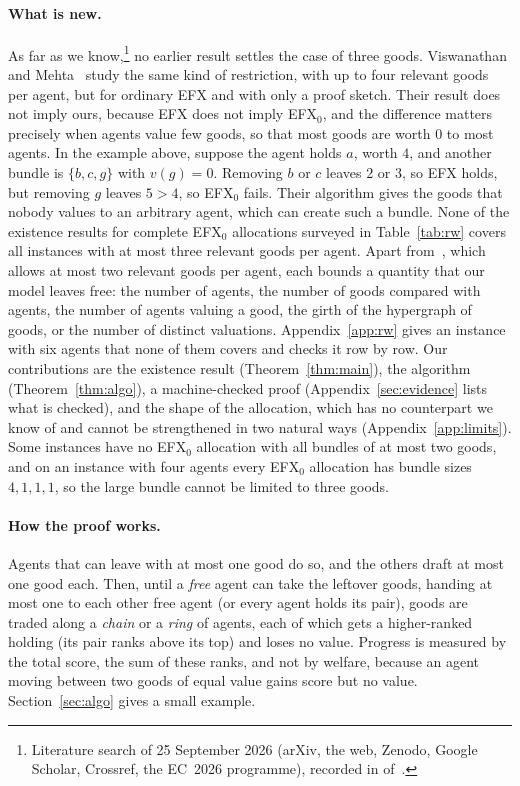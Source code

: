 \documentclass[runningheads,11pt]{llncs}
\newcommand{\efxz}{\texorpdfstring{\mbox{EFX$_0$}}{EFX0}}
\begin{document}
\paragraph{What is new.} As far as we know,\footnote{Literature search of 25 September 2026 (arXiv, the web, Zenodo, Google Scholar, Crossref, the EC~2026 programme), recorded in  of~\cite{Repo}.} no earlier result settles the case of three goods. Viswanathan and Mehta~\cite{ViswanathanM24} study the same kind of restriction, with up to four relevant goods per agent, but for ordinary EFX and with only a proof sketch. Their result does not imply ours, because EFX does not imply \efxz{}, and the difference matters precisely when agents value few goods, so that most goods are worth $0$ to most agents. In the example above, suppose the agent holds $a$, worth $4$, and another bundle is $\{b,c,g\}$ with $v(g)=0$. Removing $b$ or $c$ leaves $2$ or $3$, so EFX holds, but removing $g$ leaves $5>4$, so \efxz{} fails. Their algorithm gives the goods that nobody values to an arbitrary agent, which can create such a bundle. None of the existence results for complete \efxz{} allocations surveyed in Table~\ref{tab:rw} covers all instances with at most three relevant goods per agent. Apart from~\cite{MrdEfx}, which allows at most two relevant goods per agent, each bounds a quantity that our model leaves free: the number of agents, the number of goods compared with agents, the number of agents valuing a good, the girth of the hypergraph of goods, or the number of distinct valuations. Appendix~\ref{app:rw} gives an instance with six agents that none of them covers and checks it row by row. Our contributions are the existence result (Theorem~\ref{thm:main}), the algorithm (Theorem~\ref{thm:algo}), a machine-checked proof (Appendix~\ref{sec:evidence} lists what is checked), and the shape of the allocation, which has no counterpart we know of and cannot be strengthened in two natural ways (Appendix~\ref{app:limits}). Some instances have no \efxz{} allocation with all bundles of at most two goods, and on an instance with four agents every \efxz{} allocation has bundle sizes $4,1,1,1$, so the large bundle cannot be limited to three goods.

\paragraph{How the proof works.} Agents that can leave with at most one good do so, and the others draft at most one good each. Then, until a \emph{free} agent can take the leftover goods, handing at most one to each other free agent (or every agent holds its pair), goods are traded along a \emph{chain} or a \emph{ring} of agents, each of which gets a higher-ranked holding (its pair ranks above its top) and loses no value. Progress is measured by the total score, the sum of these ranks, and not by welfare, because an agent moving between two goods of equal value gains score but no value. Section~\ref{sec:algo} gives a small example.
\end{document}
